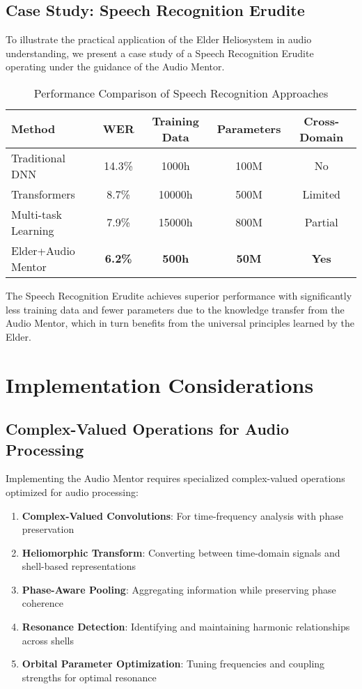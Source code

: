 \subsection{Case Study: Speech Recognition Erudite}

To illustrate the practical application of the Elder Heliosystem in audio understanding, we present a case study of a Speech Recognition Erudite operating under the guidance of the Audio Mentor.

\begin{table}[h]
\centering
\caption{Performance Comparison of Speech Recognition Approaches}
\label{tab:speech_recognition}
\begin{tabular}{|l|c|c|c|c|}
\hline
\textbf{Method} & \textbf{WER} & \textbf{Training Data} & \textbf{Parameters} & \textbf{Cross-Domain} \\
\hline
Traditional DNN & 14.3\% & 1000h & 100M & No \\
\hline
Transformers & 8.7\% & 10000h & 500M & Limited \\
\hline
Multi-task Learning & 7.9\% & 15000h & 800M & Partial \\
\hline
Elder+Audio Mentor & \textbf{6.2\%} & \textbf{500h} & \textbf{50M} & \textbf{Yes} \\
\hline
\end{tabular}
\end{table}

The Speech Recognition Erudite achieves superior performance with significantly less training data and fewer parameters due to the knowledge transfer from the Audio Mentor, which in turn benefits from the universal principles learned by the Elder.

\section{Implementation Considerations}

\subsection{Complex-Valued Operations for Audio Processing}

Implementing the Audio Mentor requires specialized complex-valued operations optimized for audio processing:

\begin{enumerate}
    \item \textbf{Complex-Valued Convolutions}: For time-frequency analysis with phase preservation
    \item \textbf{Heliomorphic Transform}: Converting between time-domain signals and shell-based representations
    \item \textbf{Phase-Aware Pooling}: Aggregating information while preserving phase coherence
    \item \textbf{Resonance Detection}: Identifying and maintaining harmonic relationships across shells
    \item \textbf{Orbital Parameter Optimization}: Tuning frequencies and coupling strengths for optimal resonance
\end{enumerate}

